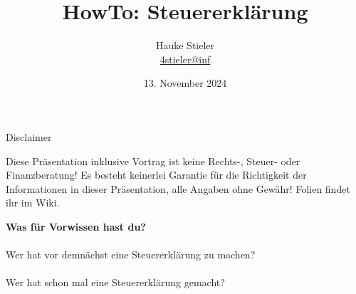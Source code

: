 \documentclass{beamer}
\author[Hauke Stieler]{Hauke Stieler\\\href{mailto:4stieler@informatik.uni-hamburg.de}{4stieler@inf}}
\title{HowTo: Steuererklärung}
\date{13. November 2024}
\begin{document}
	{
		\addtocounter{page}{-1}
		\frame{}
	}

	{
		\maketitle
		\addtocounter{page}{-1}
	}
	
	\begin{frame}{Disclaimer}
		\begin{center}
			Diese Präsentation inklusive Vortrag ist keine Rechts-, Steuer- oder Finanzberatung!\n\pause
			Es besteht keinerlei Garantie für die Richtigkeit der Informationen in dieser Präsentation, alle Angaben ohne Gewähr!\n\pause
			Folien findet ihr im Wiki.
		\end{center}
	\end{frame}

	\begin{frame}
		\begin{center}
			\textbf{Was für Vorwissen hast du?}\\\pause
			\hfill\\
			Wer hat vor demnächst eine Steuererklärung zu machen?\\\pause
			\hfill\\
			Wer hat schon mal eine Steuererklärung gemacht?
		\end{center}
	\end{frame}
\end{document}
